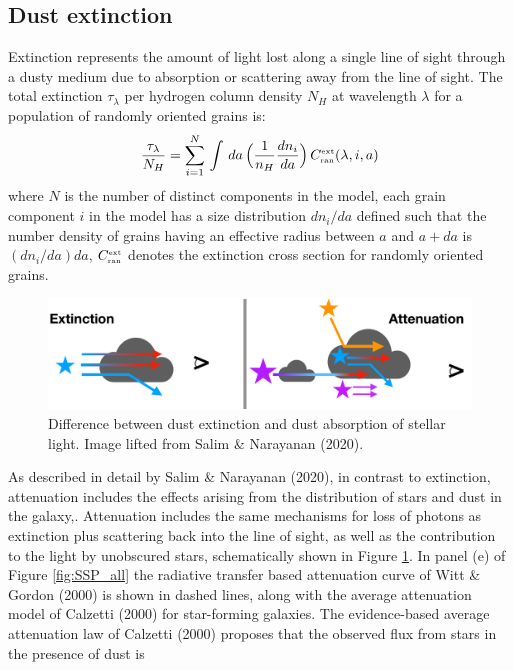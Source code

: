 \subsection{Dust extinction}\label{sec:DustExt}
Extinction represents the amount of light lost along a single line of sight through a dusty medium due to absorption or scattering away from the line of sight. The total extinction $\tau_\lambda$ per hydrogen column density $N_H$ at wavelength $\lambda$ for a population of randomly oriented grains is:
\begin{equation}
    \dfrac{\tau_\lambda}{N_H} = \sum_{i=1}^N \, \int \,da\,\Big(\frac{1}{n_H}\dfrac{dn_i}{da} \Big) \,C^{\text{\tiny{ext}}}_{\text{\tiny{ran}}}(\lambda, i, a) \label{eq:extiction}
\end{equation}
where $N$ is the number of distinct components in the model, each grain component $i$ in the model has a size distribution $dn_i /da$ defined such that the number density of grains having an effective radius between $a$ and $a + da$ is $(dn_i/da) da$, $C^{\text{\tiny{ext}}}_{\text{\tiny{ran}}}$ denotes the extinction cross section for randomly oriented grains.\\
\begin{figure}
\centering
  \includegraphics[width = 0.8 \textwidth]{figures/SalimDust.png}
 \caption{Difference between dust extinction and dust absorption of stellar light. Image lifted from Salim \& Narayanan (2020)\cite{SalimNara2020}. }
  \label{fig:Dust_extatt}
\end{figure}
As described in detail by Salim \& Narayanan (2020)\cite{SalimNara2020}, in contrast to extinction, attenuation includes the effects arising from the distribution of stars and dust in the galaxy,. Attenuation includes the same mechanisms for loss of photons as extinction plus scattering back into the line of sight, as well as the contribution to the light by unobscured stars, schematically shown in Figure \ref{fig:Dust_extatt}. 
In panel (e) of Figure \ref{fig:SSP_all} the radiative transfer based attenuation curve of Witt \& Gordon (2000)\cite{WittGord2000} is shown in dashed lines, along with the average attenuation model of Calzetti (2000)\cite{Calzetti2000} for star-forming galaxies. The evidence-based average attenuation law of Calzetti (2000)\cite{Calzetti2000} proposes that the observed flux from stars in the presence of dust is
